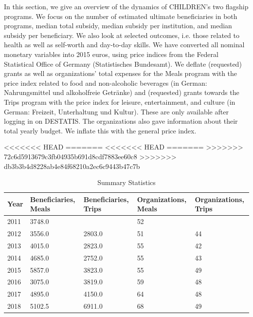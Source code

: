 \documentclass[12pt, a4paper, titlepage]{article}\usepackage[]{graphicx}\usepackage[]{color}
\begin{document}
In this section, we give an overview of the dynamics of CHILDREN's two flagship programs. We focus on the number of estimated ultimate beneficiaries in both programs, median total subsidy, median subsidy per institution, and median subsidy per beneficiary. We also look at selected outcomes, i.e. those related to health as well as self-worth and day-to-day skills. We have converted all nominal monetary variables into 2015 euros, using price indices from the Federal Statistical Office of Germany (Statistisches Bundesamt). We deflate (requested) grants as well as organizations' total expenses for the Meals program  with the price index related to food and non-alcoholic beverages (in German: Nahrungsmittel und alkoholfreie Getränke) and (requested) grants towards the Trips program with the price index for leisure, entertainment, and culture (in German: Freizeit, Unterhaltung und Kultur). These are only available after logging in on DESTATIS. The organizations also gave information about their total yearly budget. We inflate this with the general price index.

<<<<<<< HEAD
=======
<<<<<<< HEAD
=======
>>>>>>> 72c6d5913679c3fb04935b691d8cdf7883ee60c8
>>>>>>> db3b3b4d8228ab4e84f68210a2ec6c9443b47c7b
\begin{table}[ht]
\centering
\begin{tabular}{mmmmm}
  \hline
Year & Beneficiaries, Meals & Beneficiaries, Trips & Organizations, Meals & Organizations, Trips \\ 
  \hline
2011 & 3748.0 &  & 52 &  \\ 
  2012 & 3556.0 & 2803.0 & 51 & 44 \\ 
  2013 & 4015.0 & 2823.0 & 55 & 42 \\ 
  2014 & 4685.0 & 2752.0 & 55 & 43 \\ 
  2015 & 5857.0 & 3823.0 & 55 & 49 \\ 
  2016 & 3075.0 & 3819.0 & 59 & 48 \\ 
  2017 & 4895.0 & 4150.0 & 64 & 48 \\ 
  2018 & 5102.5 & 6911.0 & 68 & 49 \\ 
   \hline
\end{tabular}
\caption{Summary Statistics} 
\label{fundamentalDynamics}
\end{table}

\end{document}
